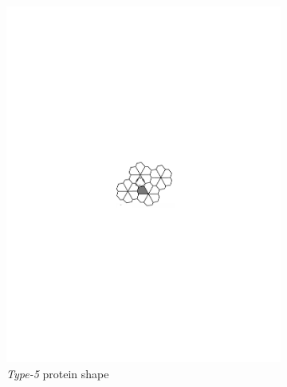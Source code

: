 \documentclass[12pt,letter]{article}
\begin{document}
\begin{figure}[h]
	\centering
	\caption{Individual Protein Shape}
	\begin{subfigure}[h]{0.35\textwidth}
		\includegraphics[width = \textwidth]{tile5.pdf}
		\caption{\textit{Type-5} protein shape}
		\label{fig:tile5}
	\end{subfigure}
	~
	\begin{subfigure}[h]{0.35\textwidth}

\end{subfigure}
\end{figure}
\end{document}
